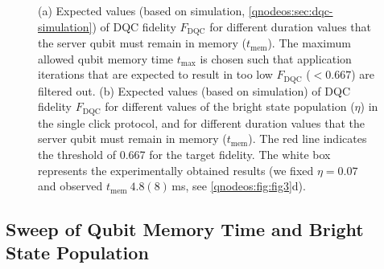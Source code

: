 \begin{figure}[htbp]
    \centering
    \hfill
    \caption{
        (a) Expected values (based on simulation, \cref{qnodeos:sec:dqc-simulation}) of \ac{DQC} fidelity $F_{\text{DQC}}$ for different duration values that the server qubit must remain in memory ($t_{\text{mem}}$). The maximum allowed qubit memory time $t_{\max}$ is chosen such that application iterations that are expected to result in too low $F_{\text{DQC}}$ ($<0.667$) are filtered out.
        (b) Expected values (based on simulation) of \ac{DQC} fidelity $F_{\text{DQC}}$ for different values of the bright state population ($\eta$) in the single click protocol, and for different duration values that the server qubit must remain in memory ($t_{\text{mem}}$). The red line indicates the threshold of 0.667 for the target fidelity. The white box represents the experimentally obtained results (we fixed $\eta = 0.07$ and observed $t_{\text{mem}} ~4.8(8)$\,ms, see \cref{qnodeos:fig:fig3}d).
    }
    \label{qnodeos:fig:delcomp-simulation}
\end{figure}

\subsection{Sweep of Qubit Memory Time and Bright State Population}

